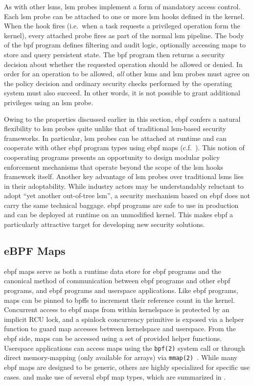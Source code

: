 As with other \gls{lsm}s, \gls{lsm} probes implement a form of mandatory access control.
Each \gls{lsm} probe can be attached to one or more \gls{lsm} hooks defined in the kernel.
When the hook fires (i.e.~when a task requests a privileged operation form the kernel),
every attached probe fires as part of the normal \gls{lsm} pipeline. The body of the
\gls{bpf} program defines filtering and audit logic, optionally accessing maps to store
and query persistent state. The \gls{bpf} program then returns a security decision about
whether the requested operation should be allowed or denied.  In order for an operation to
be allowed, \textit{all} other \gls{lsm}s and \gls{lsm} probes must agree on the policy
decision and ordinary security checks performed by the operating system must also succeed.
In other words, it is not possible to grant additional privileges using an \gls{lsm}
probe.

Owing to the properties discussed earlier in this section, \gls{ebpf} confers a natural
flexibility to \gls{lsm} probes quite unlike that of traditional \gls{lsm}-based security
frameworks.  In particular, \gls{lsm} probes can be attached at runtime and can cooperate
with other \gls{ebpf} program types using \gls{ebpf} maps (c.f.~).
This notion of cooperating programs presents an opportunity to design modular policy
enforcement mechanisms that operate beyond the scope of the \gls{lsm} hooks framework
itself.  Another key advantage of \gls{lsm} probes over traditional \gls{lsm}s lies in
their adoptability.  While industry actors may be understandably reluctant to adopt
\enquote{yet another out-of-tree \gls{lsm}}, a security mechanism based on \gls{ebpf} does
not carry the same technical baggage.  \gls{ebpf} programs are safe to use in production
and can be deployed at runtime on an unmodified kernel.  This makes \gls{ebpf}
a particularly attractive target for developing new security solutions.

\subsection{eBPF Maps}%
\label{ss:bpf-maps-bg}

\gls{ebpf} maps serve as both a runtime data store for \gls{ebpf} programs and the
canonical method of communication between \gls{ebpf} programs and other \gls{ebpf}
programs, and \gls{ebpf} programs and userspace applications. Like \gls{ebpf} programs,
maps can be pinned to \gls{bpffs} to increment their reference count in the kernel.
Concurrent access to \gls{ebpf} maps from within kernelspace is protected by an implicit
RCU lock, and a spinlock concurrency primitive is exposed via a helper function to guard
map accesses between kernelspace and userspace.  From the \gls{ebpf} side, maps can be
accessed using a set of provided helper functions.  Userspace applications can access maps
using the \texttt{bpf(2)} system call or through direct memory-mapping (only available for
arrays) via \texttt{mmap(2)~\cite{gregg2019_bpf}}. While many \gls{ebpf} maps are designed
to be generic, others are highly specialized for specific use cases. \bpfcontain{} and
\bpfbox{} make use of several \gls{ebpf} map types, which are summarized in
.

